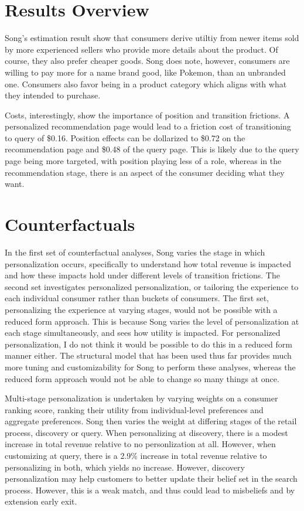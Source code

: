 \documentclass[11pt]{article}
\theoremstyle{definition}
\theoremstyle{remark}
\begin{document}
\section{Results Overview}

Song's estimation result show that consumers derive utiltiy from newer items sold by more experienced sellers who provide more details about the product. Of course, they also prefer cheaper
goods. Song does note, however, consumers are willing to pay more for a name brand good, like Pokemon, than an unbranded one. Consumers also favor being in a product category which aligns 
with what they intended to purchase. 

Costs, interestingly, show the importance of position and transition frictions. A personalized recommendation page would lead to a friction cost of transitioning to query of \$0.16. Position
effects can be dollarized to \$0.72 on the recommendation page and \$0.48 of the query page. This is likely due to the query page being more targeted, with position playing less of a role, whereas
in the recommendation stage, there is an aspect of the consumer deciding what they want.

\section{Counterfactuals}

In the first set of counterfactual analyses, Song varies the stage in which personalization occurs, specifically to understand how total revenue is impacted and how these impacts
hold under different levels of transition frictions. The second set investigates personalized personalization, or tailoring the experience to each individual consumer rather than 
buckets of consumers. The first set, personalizing the experience at varying stages, would not be possible with a reduced form approach. This is because Song varies the level
of personalization at each stage simultaneously, and sees how utility is impacted. For personalized personalization, I do not think it would be possible to do this in a reduced form
manner either. The structural model that has been used thus far provides much more tuning and customizability for Song to perform these analyses, whereas the reduced form approach
would not be able to change so many things at once.

Multi-stage personalization is undertaken by varying weights on a consumer ranking score, ranking their utility from individual-level preferences and aggregate preferences. Song then
varies the weight at differing stages of the retail process, discovery or query. When personalizing at discovery, there is a modest increase in total revenue relative to no personlization
at all. However, when customizing at query, there is a 2.9\% increase in total revenue relative to personalizing in both, which yields no increase. However, discovery personalization may help
customers to better update their belief set in the search process. However, this is a weak match, and thus could lead to misbeliefs and by extension early exit.
\end{document}
